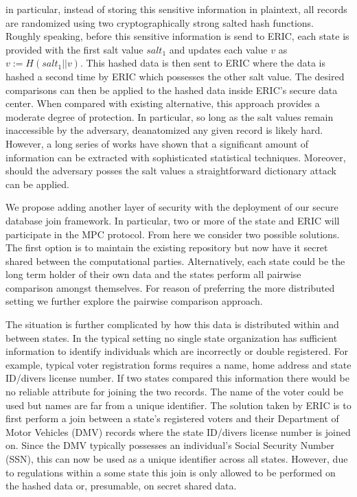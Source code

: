 in particular, instead of storing this sensitive information in plaintext, all records are randomized using two cryptographically strong salted hash functions. Roughly speaking, before this sensitive information is send to ERIC, each state is provided with the first salt value $salt_1$ and updates each value $v$ as $v := H(salt_1 || v)$. This hashed data is then sent to ERIC where the data is hashed a second time by ERIC which possesses the other salt value. The desired comparisons can then be applied to the hashed data inside ERIC's secure data center. When compared with existing alternative, this approach provides a moderate degree of protection. In particular, so long as the salt values remain inaccessible by the adversary, deanatomized any given record is likely hard. However, a long series of works \cite{...,...,...,...,...,...} have shown that a significant amount of information can be extracted with sophisticated statistical techniques. Moreover, should the adversary posses the salt values a straightforward dictionary attack can be applied.

We propose adding another layer of security with the deployment of our secure database join framework. In particular, two or more of the state and ERIC will participate in the MPC protocol. From here we consider two possible solutions. The first option is to maintain the existing repository but now have it secret shared between the computational parties. Alternatively, each state could be the long term holder of their own data and the states perform all pairwise comparison amongst themselves. For reason of preferring the more distributed setting we further explore the pairwise comparison approach. 

The situation is further complicated by how this data is distributed within and between states. In the typical setting no single state organization has sufficient information to identify individuals which are incorrectly or double registered. For example, typical voter registration forms requires a name, home address and state ID/divers license number. If two states compared this information there would be no reliable attribute for joining the two records. The name of the voter could be used but names are far from a unique identifier. The solution taken by ERIC is to first perform a join between a state's registered voters and their Department of Motor Vehicles (DMV) records where the state ID/divers license number is joined on. Since the DMV typically possesses an individual's Social Security Number (SSN), this can now be used as a unique identifier across all states. However, due to regulations within a some state this join is only allowed to be performed on the hashed data or, presumable, on secret shared data.

